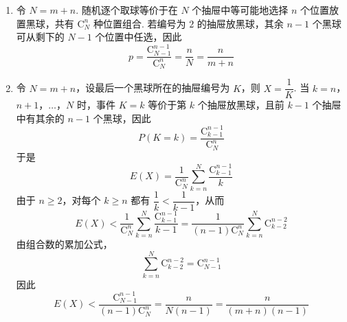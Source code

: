 \begin{solution}
\begin{enumerate}
\item 令 \(N=m+n\). 随机逐个取球等价于在 \(N\) 个抽屉中等可能地选择 \(n\) 个位置放置黑球，共有 \(\mathrm C_N^n\) 种位置组合. 若编号为 \(2\) 的抽屉放黑球，其余 \(n-1\) 个黑球可从剩下的 \(N-1\) 个位置中任选，因此
\[
p=\frac{\mathrm C_{N-1}^{n-1}}{\mathrm C_N^n}
=\frac{n}{N}=\frac{n}{m+n}
\]
\item 令 \(N=m+n\)，设最后一个黑球所在的抽屉编号为 \(K\)，则 \(X=\dfrac1K\). 当 \(k=n\)，\(n+1\)，\(\ldots\)，\(N\) 时，事件 \(K=k\) 等价于第 \(k\) 个抽屉放黑球，且前 \(k-1\) 个抽屉中有其余的 \(n-1\) 个黑球，因此
\[
P(K=k)=\dfrac{\mathrm C_{k-1}^{n-1}}{\mathrm C_N^n}
\]
于是
\[
E(X)=\dfrac1{\mathrm C_N^n}\sum_{k=n}^{N}\dfrac{\mathrm C_{k-1}^{n-1}}{k}
\]
由于 \(n\ge2\)，对每个 \(k\ge n\) 都有 \(\dfrac1k<\dfrac1{k-1}\)，从而
\[
E(X)<\dfrac1{\mathrm C_N^n}\sum_{k=n}^{N}\dfrac{\mathrm C_{k-1}^{n-1}}{k-1}=\dfrac1{(n-1)\mathrm C_N^n}\sum_{k=n}^{N}\mathrm C_{k-2}^{n-2}
\]
由组合数的累加公式，
\[
\sum_{k=n}^{N}\mathrm C_{k-2}^{n-2}=\mathrm C_{N-1}^{n-1}
\]
因此
\[
E(X)<\dfrac{\mathrm C_{N-1}^{n-1}}{(n-1)\mathrm C_N^n}=\dfrac{n}{N(n-1)}=\dfrac{n}{(m+n)(n-1)}
\]
\end{enumerate}
\end{solution}
